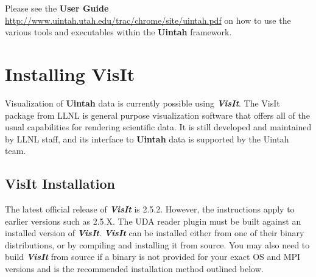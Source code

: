\documentclass[11pt,fleqn]{book} %
\begin{document}
Please see the \textbf{User Guide}
\url{http://www.uintah.utah.edu/trac/chrome/site/uintah.pdf} on how to use
the various tools and executables within the \textbf{Uintah}
framework.


\chapter{Installing VisIt}

Visualization of \textbf{Uintah} data is currently possible using
\textbf{\emph{VisIt}}. The VisIt package from LLNL is general purpose
visualization software that offers all of the usual capabilities for
rendering scientific data.  It is still developed and maintained by
LLNL staff, and its interface to \textbf{Uintah} data is supported by
the Uintah team.



\section{VisIt Installation}

The latest official release of \textbf{\emph{VisIt}} is 2.5.2.
However, the instructions apply to earlier versions such as 2.5.X.
The UDA reader plugin must be built against an installed version of
\textbf{\emph{VisIt}}.  \textbf{\emph{VisIt}} can be installed either
from one of their binary distributions, or by compiling and installing
it from source.  You may also need to build \textbf{\emph{VisIt}} from
source if a binary is not provided for your exact OS and MPI versions
and is the recommended installation method outlined below.
\end{document}
